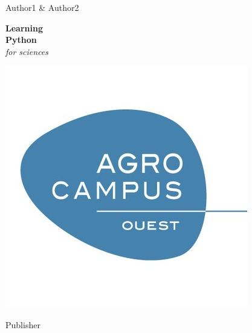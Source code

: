 
\vspace*{\baselineskip} 

\centering  
{\Large Author1 \& Author2}
\vspace*{0.167\textheight} 

\raggedleft
\textbf{\fontsize{30}{36}\selectfont Learning}\\[\baselineskip] 
\textbf{\textcolor{pythonblue}{\fontsize{50}{60}\selectfont Python}}\\[\baselineskip]  
\textcolor{pythonyellow}{\fontsize{30}{36}\selectfont \textit{for sciences}}

\vspace*{0.1\textheight} 

\centering
\includegraphics{images/agrocampus-logo.png}

\vfill 

{\large Publisher} 

